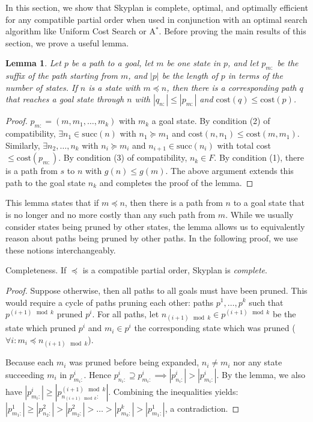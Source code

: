\documentclass[letterpaper]{article}
\theoremstyle{plain} \newtheorem{theorem}{Theorem} \newtheorem{proposition}{Proposition} \newtheorem{lemma}{Lemma}
\theoremstyle{definition} \newtheorem{definition}{Definition} \newtheorem{conjecture}{Conjecture} \newtheorem*{example}{Example}
\theoremstyle{remark} \newtheorem*{remark}{Remark} \newtheorem*{note}{Note} \newtheorem{case}{Case}
\newcommand{\Astarpunct}{A$^*$}
\begin{document}
In this section, we show that Skyplan is complete, optimal, and
optimally efficient for any compatible partial order when used in
conjunction with an optimal search algorithm like Uniform Cost
Search or \Astarpunct. Before proving the main results of this section,
we prove a useful lemma.

\begin{lemma}{}\label{clm-complete-lemma}
  Let $p$ be a path to a goal, let $m$ be one state in $p$, and let 
$p_{m:}$ be the suffix of the path starting from $m$, and $|p|$
be
the length of $p$ in terms of the number of states. If $n$ is a state
with $m \preceq n$, then there is a corresponding path $q$ that reaches a goal state
through $n$ with $|q_{n:}| \leq |p_{m:}|$ and $\mathrm{cost}(q) \leq \mathrm{cost}(p)$.
\end{lemma}

\begin{proof}
$p_{m:}=(m,m_{1},\dots,m_{k})$ with $m_{k}$ a goal state.
By condition (2) of compatibility, $\exists n_{1} \in \mathrm{succ}(n)$ 
with $n_{1} \succeq m_{1}$ and $\mathrm{cost}(n,n_{1}) \leq \mathrm{cost}(m,m_{1})$. 
Similarly, $\exists n_{2},\dots,n_{k}$ with 
$n_{i} \succeq m_{i}$ and $n_{i+1} \in \mathrm{succ}(n_{i})$ with 
total cost $\leq \mathrm{cost}(p_{m:})$.
By condition (3) of compatibility, $n_{k} \in F$. By condition (1),
there is a path from $s$ to $n$ with $g(n) \leq g(m)$. The above argument extends this path
to the goal state $n_{k}$ and completes the proof of the lemma.
\end{proof}

This lemma states that if $m \preceq n$, then there is a path from $n$ to a goal
state that is no longer and no more costly than any such path from $m$.
While we usually consider states being pruned by other states, the lemma
allows us to equivalently reason about paths being pruned by other paths.
In the following proof, we use these notions interchangeably.


\begin{claim}{Completeness.}\label{clm-complete}
   If $\preceq$ is a compatible partial order, Skyplan
is \emph{complete}.
\end{claim}
\begin{proof}
Suppose otherwise, then all paths to all goals must
have been pruned. This would require a cycle of paths pruning each other: 
paths $p^{1},\dots,p^{k}$ such that $p^{ (i+1) \mod k}$ pruned $p^{i }$.
For all paths, let $n_{(i+1) \mod k} \in p^{(i+1) \mod k}$ be the state which pruned $p^{i}$ and
$m_{i} \in p^{i}$ the corresponding state which was pruned 
($\forall i: m_{i} \preceq n_{(i+1) \mod k}$).

Because each $m_{i}$ was pruned before being expanded,
$n_{i} \neq m_{i}$ nor any state succeeding $m_{i}$ in $p^{i}_{m_{i}:}$.
Hence $p^{i}_{n_{i}:} \supseteq p^{i}_{m_{i}:} \implies |p^{i}_{n_{i}:}| > |p^{i}_{m_{i}:}|$.
By the lemma, we also have %
 $|p^{i}_{m_{i}:}| \geq |p^{(i+1)\mod k}_{n_{(i+1)\mod k}:}|$. Combining the
inequalities yields: $|p^{1}_{m_{1}:}| \geq |p^{2}_{n_{2}:}| > |p^{2}_{m_{2}:}| > \dots > |p^{k}_{m_{k}:}| > |p^{1}_{m_{1}:}|$, 
a contradiction.
\end{proof}
  
\end{document}

